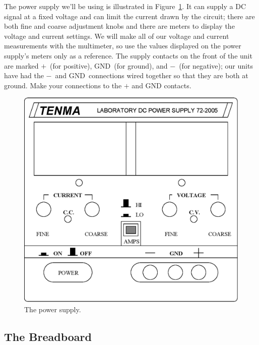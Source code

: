 The power supply we'll be using is illustrated in 
Figure~\ref{fig:DC:powersupply}.
It can supply a DC signal at a fixed voltage and can limit the current drawn
by the circuit; there are both fine and coarse adjustment knobs and there are
meters to display the voltage and current settings.  We will make all of our 
voltage and current measurements with the multimeter, so use the values 
displayed on the power supply's meters only as a reference.  The supply 
contacts on the front of the unit are marked $+$~(for positive), GND~(for 
ground), and $-$~(for negative); our units have had the $-$~and 
GND~connections wired together so that they are both at ground. Make your 
connections to the $+$ and GND contacts. 
\begin{figure}[!htb]
\centering \epsfxsize=8cm \includegraphics[scale=0.6]{2_dc/powersupply.eps} 
\caption{The power supply.}
\label{fig:DC:powersupply}
\end{figure}

\subsection{The Breadboard}

